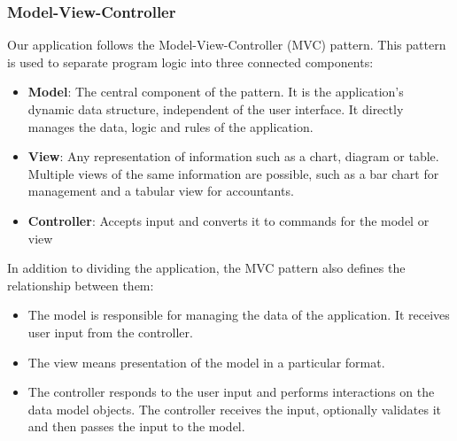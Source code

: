 \subsubsection{Model-View-Controller}
Our application follows the Model-View-Controller (MVC) pattern. This pattern is used to separate program logic into three connected components:
\begin{itemize}
\item \textbf{Model}: The central component of the pattern. It is the application's dynamic data structure, independent of the user interface. It directly manages the data, logic and rules of the application. \cite{mvc_smalltalk}
\item \textbf{View}: Any representation of information such as a chart, diagram or table. Multiple views of the same information are possible, such as a bar chart for management and a tabular view for accountants.
\item \textbf{Controller}: Accepts input and converts it to commands for the model or view \cite{mvc_controller}
\end{itemize}
In addition to dividing the application, the MVC pattern also defines the relationship between them: \cite{mvc_relationship}
\begin{itemize}
\item The model is responsible for managing the data of the application. It receives user input from the controller.
\item The view means presentation of the model in a particular format.
\item The controller responds to the user input and performs interactions on the data model objects. The controller receives the input, optionally validates it and then passes the input to the model.
\end{itemize}

